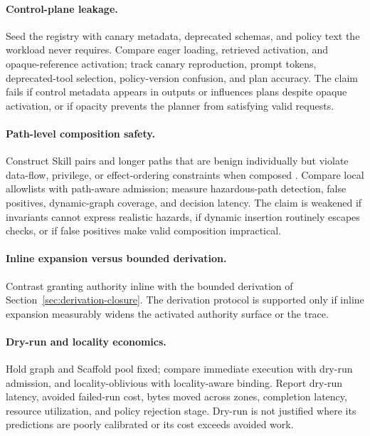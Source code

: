 \paragraph{Control-plane leakage.}
Seed the registry with canary metadata, deprecated schemas, and policy text the workload never requires. Compare eager loading, retrieved activation, and opaque-reference activation; track canary reproduction, prompt tokens, deprecated-tool selection, policy-version confusion, and plan accuracy. The claim fails if control metadata appears in outputs or influences plans despite opaque activation, or if opacity prevents the planner from satisfying valid requests.

\paragraph{Path-level composition safety.}
Construct Skill pairs and longer paths that are benign individually but violate data-flow, privilege, or effect-ordering constraints when composed \cite{xie2026composition}. Compare local allowlists with path-aware admission; measure hazardous-path detection, false positives, dynamic-graph coverage, and decision latency. The claim is weakened if invariants cannot express realistic hazards, if dynamic insertion routinely escapes checks, or if false positives make valid composition impractical.

\paragraph{Inline expansion versus bounded derivation.}
Contrast granting authority inline with the bounded derivation of Section~\ref{sec:derivation-closure}. The derivation protocol is supported only if inline expansion measurably widens the activated authority surface or the trace.

\paragraph{Dry-run and locality economics.}
Hold graph and Scaffold pool fixed; compare immediate execution with dry-run admission, and locality-oblivious with locality-aware binding. Report dry-run latency, avoided failed-run cost, bytes moved across zones, completion latency, resource utilization, and policy rejection stage. Dry-run is not justified where its predictions are poorly calibrated or its cost exceeds avoided work.

